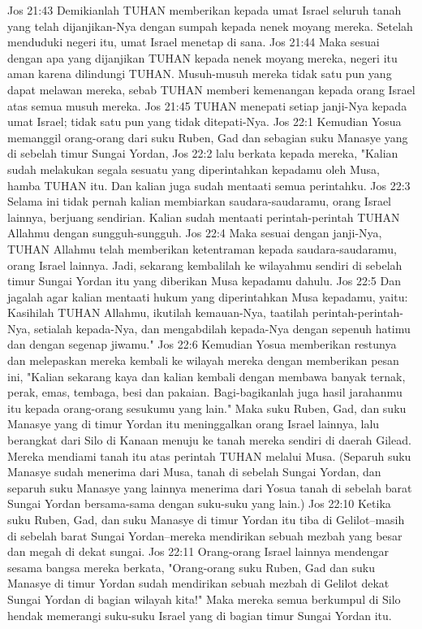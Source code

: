 Jos 21:43  Demikianlah TUHAN memberikan kepada umat Israel seluruh tanah yang telah dijanjikan-Nya dengan sumpah kepada nenek moyang mereka. Setelah menduduki negeri itu, umat Israel menetap di sana.
Jos 21:44  Maka sesuai dengan apa yang dijanjikan TUHAN kepada nenek moyang mereka, negeri itu aman karena dilindungi TUHAN. Musuh-musuh mereka tidak satu pun yang dapat melawan mereka, sebab TUHAN memberi kemenangan kepada orang Israel atas semua musuh mereka.
Jos 21:45  TUHAN menepati setiap janji-Nya kepada umat Israel; tidak satu pun yang tidak ditepati-Nya.
Jos 22:1  Kemudian Yosua memanggil orang-orang dari suku Ruben, Gad dan sebagian suku Manasye yang di sebelah timur Sungai Yordan,
Jos 22:2  lalu berkata kepada mereka, "Kalian sudah melakukan segala sesuatu yang diperintahkan kepadamu oleh Musa, hamba TUHAN itu. Dan kalian juga sudah mentaati semua perintahku.
Jos 22:3  Selama ini tidak pernah kalian membiarkan saudara-saudaramu, orang Israel lainnya, berjuang sendirian. Kalian sudah mentaati perintah-perintah TUHAN Allahmu dengan sungguh-sungguh.
Jos 22:4  Maka sesuai dengan janji-Nya, TUHAN Allahmu telah memberikan ketentraman kepada saudara-saudaramu, orang Israel lainnya. Jadi, sekarang kembalilah ke wilayahmu sendiri di sebelah timur Sungai Yordan itu yang diberikan Musa kepadamu dahulu.
Jos 22:5  Dan jagalah agar kalian mentaati hukum yang diperintahkan Musa kepadamu, yaitu: Kasihilah TUHAN Allahmu, ikutilah kemauan-Nya, taatilah perintah-perintah-Nya, setialah kepada-Nya, dan mengabdilah kepada-Nya dengan sepenuh hatimu dan dengan segenap jiwamu."
Jos 22:6  Kemudian Yosua memberikan restunya dan melepaskan mereka kembali ke wilayah mereka dengan memberikan pesan ini, "Kalian sekarang kaya dan kalian kembali dengan membawa banyak ternak, perak, emas, tembaga, besi dan pakaian. Bagi-bagikanlah juga hasil jarahanmu itu kepada orang-orang sesukumu yang lain." Maka suku Ruben, Gad, dan suku Manasye yang di timur Yordan itu meninggalkan orang Israel lainnya, lalu berangkat dari Silo di Kanaan menuju ke tanah mereka sendiri di daerah Gilead. Mereka mendiami tanah itu atas perintah TUHAN melalui Musa. (Separuh suku Manasye sudah menerima dari Musa, tanah di sebelah Sungai Yordan, dan separuh suku Manasye yang lainnya menerima dari Yosua tanah di sebelah barat Sungai Yordan bersama-sama dengan suku-suku yang lain.)
Jos 22:10  Ketika suku Ruben, Gad, dan suku Manasye di timur Yordan itu tiba di Gelilot--masih di sebelah barat Sungai Yordan--mereka mendirikan sebuah mezbah yang besar dan megah di dekat sungai.
Jos 22:11  Orang-orang Israel lainnya mendengar sesama bangsa mereka berkata, "Orang-orang suku Ruben, Gad dan suku Manasye di timur Yordan sudah mendirikan sebuah mezbah di Gelilot dekat Sungai Yordan di bagian wilayah kita!" Maka mereka semua berkumpul di Silo hendak memerangi suku-suku Israel yang di bagian timur Sungai Yordan itu.
